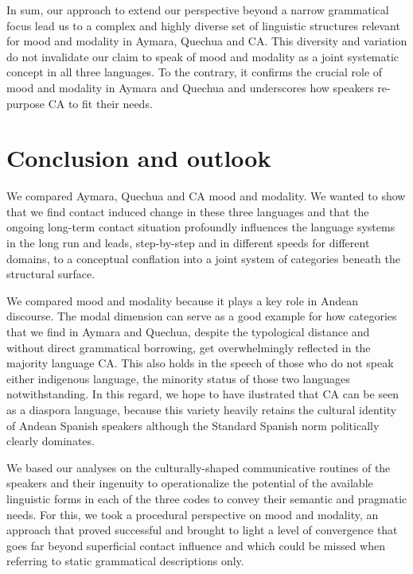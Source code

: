 \documentclass[output=paper,hidelinks]{langscibook}
\begin{document}
In sum, our approach to extend our perspective beyond a narrow grammatical focus lead us to a complex and highly diverse set of linguistic structures relevant for mood and modality in Aymara, Quechua and CA. This diversity and variation do not invalidate our claim to speak of mood and modality as a joint systematic concept in all three languages. To the contrary, it confirms the crucial role of mood and modality in Aymara and Quechua and underscores how speakers re-purpose CA to fit their needs. 


\section{Conclusion and outlook}
\label{conclusion}
We compared Aymara, Quechua and CA mood and modality. We wanted to show that we find contact induced change in these three languages and that the ongoing long-term contact situation profoundly influences the language systems in the long run and leads, step-by-step and in different speeds for different domains, to a conceptual conflation into a joint system of categories beneath the structural surface.

We compared mood and modality because it plays a key role in Andean discourse. The modal dimension can serve as a good example for how categories that we find in Aymara and Quechua, despite the typological distance and without direct grammatical borrowing, get overwhelmingly reflected in the majority language CA. This also holds in the speech of those who do not speak either indigenous language, the minority status of those two languages notwithstanding. In this regard, we hope to have ilustrated that CA can be seen as a diaspora language, because this variety heavily retains the cultural identity of Andean Spanish speakers although the Standard Spanish norm politically clearly dominates.

We based our analyses on the culturally-shaped communicative routines of the speakers and their ingenuity to operationalize the potential of the available linguistic forms in each of the three codes to convey their semantic and pragmatic needs. For this, we took a procedural perspective on mood and modality, an approach that proved successful and brought to light a level of convergence that goes far beyond superficial contact influence and which could be missed when referring to static grammatical descriptions only. 
\end{document}
